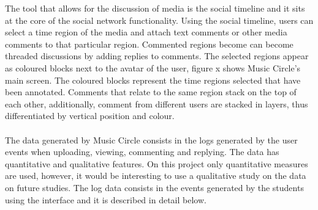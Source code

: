 \documentclass[11pt, oneside]{article}   	%
\begin{document}
\newpage
\noindent The tool that allows for the discussion of media is the social timeline and it sits at the core of the social network functionality. Using the social timeline, users can select a time region of the media and attach text comments or other media comments to that particular region. Commented regions become can become threaded discussions by adding replies to comments. The selected regions appear as coloured blocks next to the avatar of the user, figure x shows Music Circle's main screen. The coloured blocks represent the time regions selected that have been annotated. Comments that relate to the same region stack on the top of each other, additionally, comment from different users are stacked in layers, thus differentiated by vertical position and colour.\\\\
The data generated by Music Circle consists in the logs generated by the user events when uploading, viewing, commenting and replying. The data has quantitative and qualitative features. On this project only quantitative measures are used, however, it would be interesting to use a qualitative study on the data on future studies. The log data consists in the events generated by the students using the interface and it is described in detail below.\\\\
\end{document}
